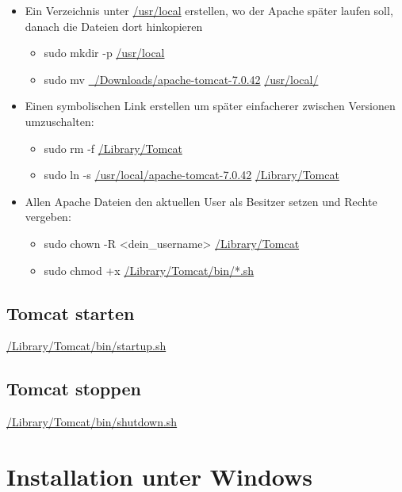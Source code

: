 \begin{itemize}
\item Ein Verzeichnis unter \href{file:///usr/local}{/usr/local} erstellen, wo der Apache später laufen soll, danach die Dateien dort hinkopieren
\begin{itemize}
	\item sudo mkdir -p \href{file:///usr/local}{/usr/local}
	\item sudo mv \href{file:///Users/stefan/Downloads/apache-tomcat-7.0.42}{~/Downloads/apache-tomcat-7.0.42} \href{file:///usr/local}{/usr/local/}
\end{itemize}\item Einen symbolischen Link erstellen um später einfacherer zwischen Versionen umzuschalten:
\begin{itemize}
	\item sudo rm -f \href{file:///Library/Tomcat}{/Library/Tomcat}
	\item sudo ln -s \href{file:///usr/local/apache-tomcat-7.0.42}{/usr/local/apache-tomcat-7.0.42} \href{file:///Library/Tomcat}{/Library/Tomcat}
\end{itemize}\item Allen Apache Dateien den aktuellen User als Besitzer setzen und Rechte vergeben:
\begin{itemize}
	\item sudo chown -R \textless{}dein\_username\textgreater{} \href{file:///Library/Tomcat}{/Library/Tomcat}
	\item sudo chmod +x \href{file:///Library/Tomcat/bin/*.sh}{/Library/Tomcat/bin/*.sh}
\end{itemize}\end{itemize}

\subsection{Tomcat starten}

\href{file:///Library/Tomcat/bin/startup.sh}{/Library/Tomcat/bin/startup.sh}

\subsection{Tomcat stoppen}

\href{file:///Library/Tomcat/bin/shutdown.sh}{/Library/Tomcat/bin/shutdown.sh}

\section{Installation unter Windows}

